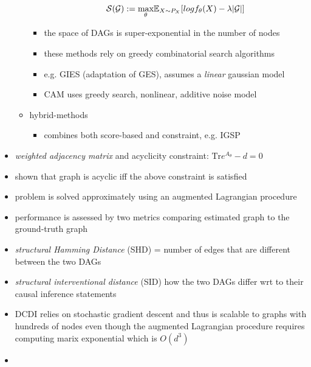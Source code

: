 \begin{itemize}
\begin{itemize}
\begin{itemize}
      \begin{equation*}
        \mathcal{S}(\mathcal{G}) := \underset{\theta}{\text{max}} \mathbb{E}_{X \sim P_{X}}[log f_{\theta}(X) - \lambda |\mathcal{G}|]
      \end{equation*}
      \item the space of DAGs is super-exponential in the number of nodes
      \item these methods rely on greedy combinatorial search algorithms
      \item e.g. GIES (adaptation of GES), assumes a \textit{linear} gaussian model
      \item CAM uses greedy search, nonlinear, additive noise model
    \end{itemize}
    \item hybrid-methods
    \begin{itemize}
      \item combines both score-based and constraint, e.g. IGSP
    \end{itemize}
  \end{itemize}

  \item \textit{weighted adjacency matrix} and acyclicity constraint: $\text{Tr}e^{A_{\theta}} - d = 0$
  \item shown that graph is acyclic iff the above constraint is satisfied
  \item problem is solved approximately using an augmented Lagrangian procedure
  \item performance is assessed by two metrics comparing estimated graph to the ground-truth graph
  \item \textit{structural Hamming Distance} (SHD) = number of edges that are different between the two DAGs
  \item \textit{structural interventional distance} (SID) how the two DAGs differ wrt to their causal inference statements
  \item DCDI relies on stochastic gradient descent and thus is scalable to graphs with hundreds of nodes even though the augmented Lagrangian procedure requires computing marix exponential which is $O(d^{3})$
  \item\end{itemize}